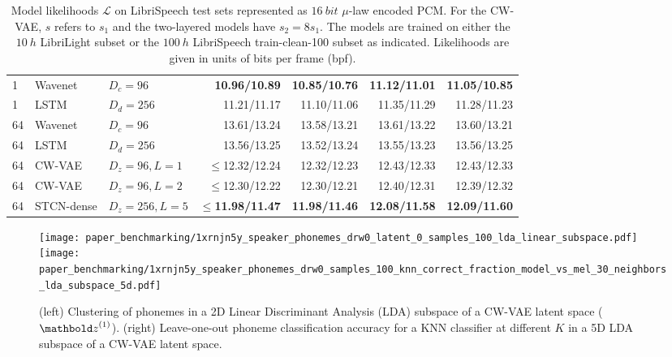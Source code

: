 {\begin{table*}[t]
\begin{adjustbox}{center, totalheight=0.182\paperheight}
\begin{tabular}{lll|rrrr}
        \midrule
        1 & Wavenet             & $D_c=96$       & \bfseries 10.96/10.89 & \bfseries 10.85/10.76 & \bfseries 11.12/11.01 & \bfseries 11.05/10.85 \\
        1 & LSTM                & $D_d=256$      & 11.21/11.17 & 11.10/11.06 & 11.35/11.29 & 11.28/11.23 \\  %
        \midrule
        64 & Wavenet            & $D_c=96$       & 13.61/13.24 & 13.58/13.21 & 13.61/13.22 & 13.60/13.21 \\  %
        64 & LSTM               & $D_d=256$      & 13.56/13.25 & 13.52/13.24 & 13.55/13.23 & 13.56/13.25 \\  %
        64 & CW-VAE             & $D_z=96,L=1$   & $\leq$12.32/12.24 & 12.32/12.23 & 12.43/12.33 & 12.43/12.33 \\
        64 & CW-VAE             & $D_z=96,L=2$   & $\leq$12.30/12.22 & 12.30/12.21 & 12.40/12.31 & 12.39/12.32 \\
        64 & STCN-dense         & $D_z=256,L=5$  & $\leq$\bfseries 11.98/11.47 & \bfseries 11.98/11.46 & \bfseries 12.08/11.58 & \bfseries 12.09/11.60 \\  %
        \bottomrule
    \end{tabular}
    \end{adjustbox}
    \caption[Model likelihoods on LibriSpeech test sets.]{
    Model likelihoods $\mathcal{L}$ on LibriSpeech test sets represented as $\SI{16}{bit}$ $\mu$-law encoded PCM.
    For the CW-VAE, $s$ refers to $s_1$ and the two-layered models have $s_2=8s_1$.
    The models are trained on either the $\SI{10}{h}$ LibriLight subset or the $\SI{100}{h}$ LibriSpeech \textrm{train-clean-100} subset as indicated.
    Likelihoods are given in units of bits per frame (bpf).
    }
    \label{tab: likelihoods librispeech}
\end{table*}
%
\begin{figure*}[t]
    \centering
    \texttt{[image: paper\_benchmarking/1xrnjn5y\_speaker\_phonemes\_drw0\_latent\_0\_samples\_100\_lda\_linear\_subspace.pdf]}
    \hfill
    \texttt{[image: paper\_benchmarking/1xrnjn5y\_speaker\_phonemes\_drw0\_samples\_100\_knn\_correct\_fraction\_model\_vs\_mel\_30\_neighbors\_lda\_subspace\_5d.pdf]}
    \caption[Clustering of phonemes in 2D subspace of CW-VAE latent space and KNN classification accuracy.]{
    (left) Clustering of phonemes in a 2D Linear Discriminant Analysis (LDA) subspace of a CW-VAE latent space ($\zb^{(1)}$).
    (right) Leave-one-out phoneme classification accuracy for a KNN classifier at different $K$ in a 5D LDA subspace of a CW-VAE latent space.
    }
    \label{fig: latent space phoneme and knn}
\end{figure*}
%

}
